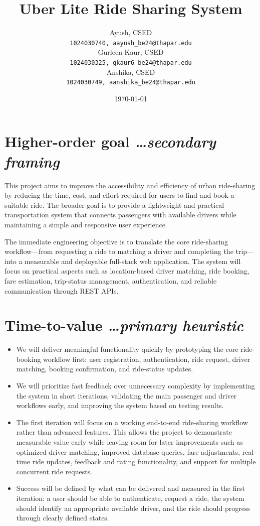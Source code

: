 \documentclass[11pt,a4paper]{article}
\title{Uber Lite Ride Sharing System}
\author{
  Ayush, CSED \\
  \texttt{1024030740, aayush\_be24@thapar.edu}
  \\[0.5em]
  Gurleen Kaur, CSED \\
  \texttt{1024030325, gkaur6\_be24@thapar.edu}
  \\[0.5em]
  Anshika, CSED \\
  \texttt{1024030749, aanshika\_be24@thapar.edu}
}
\date{\today}
\newcommand{\BvrHint}[1]{%
  {\normalfont\normalsize\itshape\hfill #1}}
\begin{document}
\maketitle


\section{Higher-order goal%
  \BvrHint{\ldots secondary framing}}

This project aims to improve the accessibility and efficiency of
urban ride-sharing by reducing the time, cost, and effort required
for users to find and book a suitable ride. The broader goal is to
provide a lightweight and practical transportation system that
connects passengers with available drivers while maintaining a
simple and responsive user experience.

The immediate engineering objective is to translate the core
ride-sharing workflow---from requesting a ride to matching a driver
and completing the trip---into a measurable and deployable
full-stack web application. The system will focus on practical
aspects such as location-based driver matching, ride booking,
fare estimation, trip-status management, authentication, and
reliable communication through REST APIs.


\section{Time-to-value%
  \BvrHint{\ldots primary heuristic}}

\begin{itemize}[leftmargin=0.7cm]

    \item We will deliver meaningful functionality quickly by
    prototyping the core ride-booking workflow first: user
    registration, authentication, ride request, driver matching,
    booking confirmation, and ride-status updates.

    \item We will prioritize fast feedback over unnecessary
    complexity by implementing the system in short iterations,
    validating the main passenger and driver workflows early, and
    improving the system based on testing results.

    \item The first iteration will focus on a working end-to-end
    ride-sharing workflow rather than advanced features. This allows
    the project to demonstrate measurable value early while leaving
    room for later improvements such as optimized driver matching,
    improved database queries, fare adjustments, real-time ride
    updates, feedback and rating functionality, and support for
    multiple concurrent ride requests.

    \item Success will be defined by what can be delivered and
    measured in the first iteration: a user should be able to
    authenticate, request a ride, the system should identify an
    appropriate available driver, and the ride should progress
    through clearly defined states.

\end{itemize}
\end{document}
